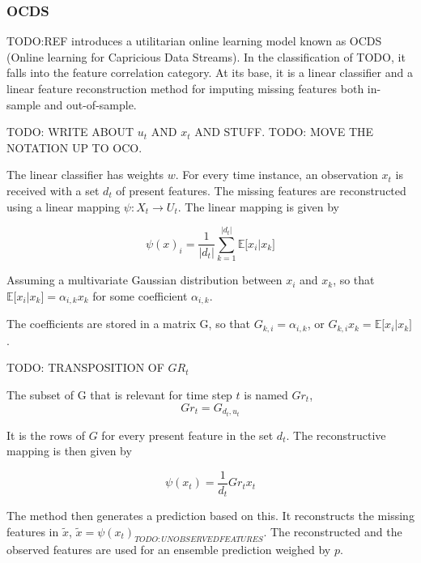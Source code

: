 \subsubsection{OCDS}

TODO:REF introduces a utilitarian online learning model known as OCDS (Online
learning for Capricious Data Streams). In the classification of TODO, it falls
into the feature correlation category. At its base, it is a linear classifier
and a linear feature reconstruction method for imputing missing features both
in-sample and out-of-sample.

TODO: WRITE ABOUT $u_t$ AND $x_t$ AND STUFF. TODO: MOVE THE NOTATION UP TO OCO.

The linear classifier has weights $w$. For every time instance, an observation
$x_t$ is received with a set $d_t$ of present features. The missing features
are reconstructed using a linear mapping $\psi : X_t \rightarrow U_t$. The
linear mapping is given by 

\begin{equation}
  \psi(x)_i = \frac {1}{|d_t|}\sum_{k=1}^{|d_t|} \mathbb E \lbrack x_i | x_k \rbrack
\end{equation}

Assuming a multivariate Gaussian distribution between $x_i$ and $x_k$, so that
$\mathbb E \lbrack x_i | x_k \rbrack = \alpha_{i,k} x_k$ for some coefficient
$\alpha_{i,k}$.

The coefficients are stored in a matrix G, so that $G_{k,i}=\alpha_{i,k}$, or $G_{k,i} x_k = \mathbb E \lbrack x_i | x_k \rbrack$.

TODO: TRANSPOSITION OF $GR_t$

The subset of G that is relevant for time step $t$ is named $Gr_t$,
\begin{equation}
  Gr_t = G_{d_t, u_t}
\end{equation}

It is the rows of $G$ for every present feature in the set $d_t$. The
reconstructive mapping is then given by 

\begin{equation}
  \psi(x_t) = \frac {1} {d_t} Gr_t x_t
\end{equation}

The method then generates a prediction based on this. It reconstructs the
missing features in $\tilde x$, $\tilde x = \psi(x_t)_{TODO: UNOBSERVED
FEATURES}$. The reconstructed and the observed features are used for an
ensemble prediction weighed by $p$.

